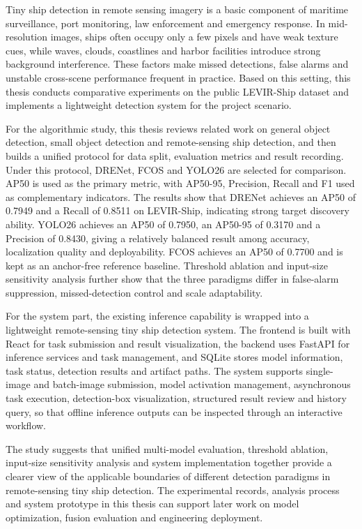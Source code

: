 \newcommand{\keywordsEn}[1][remote sensing images, tiny ship detection, LEVIR-Ship, object detection, detection system]{#1}
\begin{abstractEn}
    Tiny ship detection in remote sensing imagery is a basic component of maritime surveillance, port monitoring, law enforcement and emergency response. In mid-resolution images, ships often occupy only a few pixels and have weak texture cues, while waves, clouds, coastlines and harbor facilities introduce strong background interference. These factors make missed detections, false alarms and unstable cross-scene performance frequent in practice. Based on this setting, this thesis conducts comparative experiments on the public LEVIR-Ship dataset and implements a lightweight detection system for the project scenario.

    For the algorithmic study, this thesis reviews related work on general object detection, small object detection and remote-sensing ship detection, and then builds a unified protocol for data split, evaluation metrics and result recording. Under this protocol, DRENet, FCOS and YOLO26 are selected for comparison. AP50 is used as the primary metric, with AP50-95, Precision, Recall and F1 used as complementary indicators. The results show that DRENet achieves an AP50 of 0.7949 and a Recall of 0.8511 on LEVIR-Ship, indicating strong target discovery ability. YOLO26 achieves an AP50 of 0.7950, an AP50-95 of 0.3170 and a Precision of 0.8430, giving a relatively balanced result among accuracy, localization quality and deployability. FCOS achieves an AP50 of 0.7700 and is kept as an anchor-free reference baseline. Threshold ablation and input-size sensitivity analysis further show that the three paradigms differ in false-alarm suppression, missed-detection control and scale adaptability.

    For the system part, the existing inference capability is wrapped into a lightweight remote-sensing tiny ship detection system. The frontend is built with React for task submission and result visualization, the backend uses FastAPI for inference services and task management, and SQLite stores model information, task status, detection results and artifact paths. The system supports single-image and batch-image submission, model activation management, asynchronous task execution, detection-box visualization, structured result review and history query, so that offline inference outputs can be inspected through an interactive workflow.

    The study suggests that unified multi-model evaluation, threshold ablation, input-size sensitivity analysis and system implementation together provide a clearer view of the applicable boundaries of different detection paradigms in remote-sensing tiny ship detection. The experimental records, analysis process and system prototype in this thesis can support later work on model optimization, fusion evaluation and engineering deployment.
\end{abstractEn}
